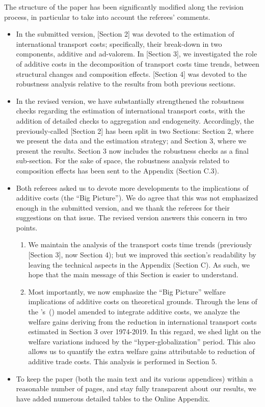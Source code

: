 \documentclass[a4paper,11pt]{article}
\newcommand\cites[1]{\citeauthor{#1}'s\ (\citeyear{#1})}
\begin{document}
The structure of the paper has been significantly modified along the revision process, in particular to take into account the referees' comments.
\begin{itemize}
	\item In the submitted version, [Section 2] was devoted to the estimation of international transport costs; specifically, their break-down in two components, additive and ad-valorem. In [Section 3], we investigated the role of additive costs in the decomposition of transport costs time trends, between structural changes and composition effects. [Section 4] was devoted to the robustness analysis relative to the results from both previous sections.
	\item In the revised version, we have substantially strengthened the robustness checks regarding the estimation of international transport costs, with the addition of detailed checks to aggregation and endogeneity. Accordingly, the previously-called [Section 2] has been split in two Sections: Section 2, where we present the data and the estimation strategy; and Section 3, where we present the results. Section 3 now includes the robustness checks as a final sub-section. For the sake of space, the robustness analysis related to composition effects has been sent to the Appendix (Section C.3).
	\item Both referees asked us to devote more developments to the implications of additive costs (the ``Big Picture''). We do agree that this was not emphasized enough in the submitted version, and we thank the referees for their suggestions on that issue. The revised version answers this concern in two points.
	\begin{enumerate}
		\item We maintain the analysis of the transport costs time trends (previously [Section 3], now Section 4); but we improved this section's readability by leaving the technical aspects in the Appendix (Section C). As such, we hope that the main message of this Section is easier to understand.
		\item Most importantly, we now emphasize the ``Big Picture'' welfare implications of additive costs on theoretical grounds. Through the lens of the \cites{melitz} model amended to integrate additive costs, we analyze the welfare gains deriving from the reduction in international transport costs estimated in Section 3 over 1974-2019. In this regard, we shed light on the welfare variations induced by the ``hyper-globalization'' period. This also allows us to quantify the extra welfare gains attributable to reduction of additive trade costs. This analysis is performed in Section 5.


	\end{enumerate}
	\item To keep the paper (both the main text and its various appendices) within a reasonable number of pages, and stay fully transparent about our results, we have added numerous detailed tables to the Online Appendix.
\end{itemize}
\end{document}

